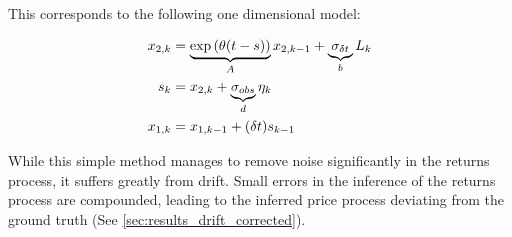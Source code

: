 \documentclass[../main.tex]{subfiles}
\begin{document}
This corresponds to the following one dimensional model:

\begin{align}
	x_{2,k} &= \underbrace{\exp\left( \theta(t-s) \right)}_{A}  x_{2,k-1} + \underbrace{\sigma_{\delta t}}_{b} L_k \notag \\
	s_k &= x_{2,k} + \underbrace{\sigma_{obs}}_{d} \eta_k \notag\\
	x_{1,k} &= x_{1,k-1} + (\delta t) s_{k-1}
\end{align}


While this simple method manages to remove noise significantly in the returns process, it suffers greatly from drift. Small errors in the inference of the returns process are compounded, leading to the inferred price process deviating from the ground truth (See \autoref{sec:results_drift_corrected}).
\end{document}
